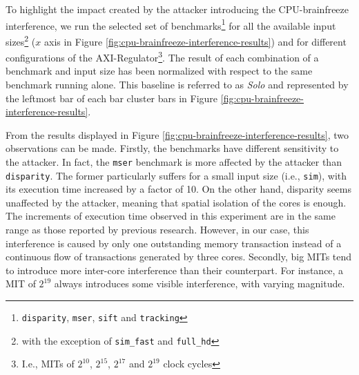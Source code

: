 
    To highlight the impact created by the attacker introducing the CPU-brainfreeze interference, we run the selected set of benchmarks\footnote{\texttt{disparity}, \texttt{mser}, \texttt{sift} and \texttt{tracking}} for all the available input sizes\footnote{with the exception of \texttt{sim\_fast} and \texttt{full\_hd}} ($x$ axis in Figure \ref{fig:cpu-brainfreeze-interference-results}) and for different configurations of the AXI-Regulator\footnote{I.e., MITs of $2^{10}$, $2^{15}$, $2^{17}$ and $2^{19}$ clock cycles}.
    The result of each combination of a benchmark and input size has been normalized with respect to the same benchmark running alone.
    This baseline is referred to as \emph{Solo} and represented by the leftmost bar of each bar cluster bars in Figure \ref{fig:cpu-brainfreeze-interference-results}.

    From the results displayed in Figure \ref{fig:cpu-brainfreeze-interference-results}, two observations can be made.
    Firstly, the benchmarks have different sensitivity to the attacker. In fact, the \texttt{mser} benchmark is more affected by the attacker than \texttt{disparity}.
    The former particularly suffers for a small input size (i.e., \texttt{sim}), with its execution time increased by a factor of 10.
    On the other hand, disparity seems unaffected by the attacker, meaning that spatial isolation of the cores is enough.
    The increments of execution time observed in this experiment are in the same range as those reported by previous research.
    However, in our case, this interference is caused by only one outstanding memory transaction instead of a continuous flow of transactions generated by three cores.
    Secondly, big MITs tend to introduce more inter-core interference than their counterpart. For instance, a MIT of $2^{19}$ always introduces some visible interference, with varying magnitude.

